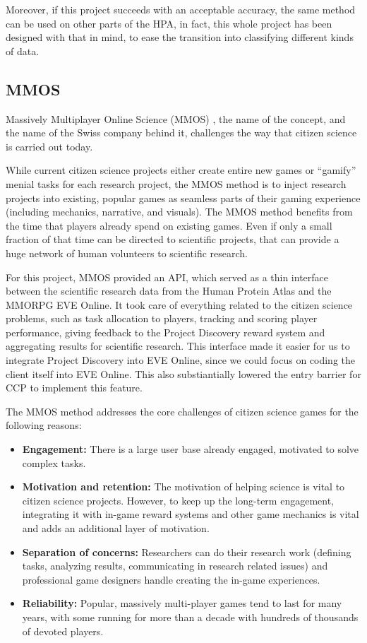 Moreover, if this project succeeds with an acceptable accuracy, the same method can be used on other parts of the HPA, in fact, this whole project has been designed with that in mind, to ease the transition into classifying different kinds of data.

\subsection{MMOS}

Massively Multiplayer Online Science (MMOS) \cite{mmos}, the name of the concept, and the name of the Swiss company behind it, challenges the way that citizen science is carried out today. 

While current citizen science projects either create entire new games or ``gamify'' menial tasks for each research project, the MMOS method is to inject research projects into existing, popular games as seamless parts of their gaming experience (including mechanics, narrative, and visuals). The MMOS method benefits from the time that players already spend on existing games. Even if only a small fraction of that time can be directed to scientific projects, that can provide a huge network of human volunteers to scientific research.

For this project, MMOS provided an API, which served as a thin interface between the scientific research data from the Human Protein Atlas and the MMORPG EVE Online. It took care of everything related to the citizen science problems, such as task allocation to players, tracking and scoring player performance, giving feedback to the Project Discovery reward system and aggregating results for scientific research. This interface made it easier for us to integrate Project Discovery into EVE Online, since we could focus on coding the client itself into EVE Online. This also substiantially lowered the entry barrier for CCP to implement this feature.

The MMOS method addresses the core challenges of citizen science games for the following reasons:

\begin{itemize}
\item {\bf Engagement:} There is a large user base already engaged, motivated to solve complex tasks.

\item {\bf Motivation and retention:} The motivation of helping 
science is vital to citizen science projects. However, to keep up the long-term engagement, integrating it with in-game reward systems and other game mechanics is vital and adds an additional layer of motivation.

\item {\bf Separation of concerns:} Researchers can do their research work (defining tasks, analyzing results, communicating in research related issues) and professional game designers handle creating the in-game experiences.

\item {\bf Reliability:} Popular, massively multi-player games tend to last for many years, with some running for more than a decade with hundreds of thousands of devoted players.
\end{itemize}

